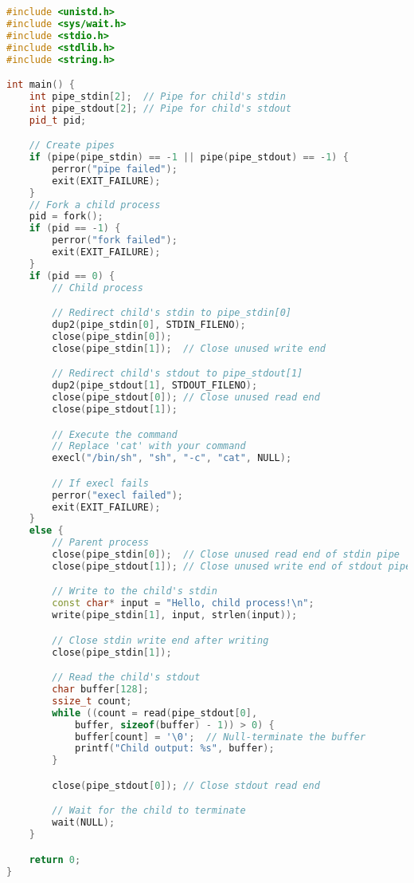 \begin{lstlisting}[language=cpp]
#include <unistd.h>
#include <sys/wait.h>
#include <stdio.h>
#include <stdlib.h>
#include <string.h>

int main() {
    int pipe_stdin[2];  // Pipe for child's stdin
    int pipe_stdout[2]; // Pipe for child's stdout
    pid_t pid;

    // Create pipes
    if (pipe(pipe_stdin) == -1 || pipe(pipe_stdout) == -1) {
        perror("pipe failed");
        exit(EXIT_FAILURE);
    }
    // Fork a child process
    pid = fork();
    if (pid == -1) {
        perror("fork failed");
        exit(EXIT_FAILURE);
    }
    if (pid == 0) {
        // Child process

        // Redirect child's stdin to pipe_stdin[0]
        dup2(pipe_stdin[0], STDIN_FILENO);
        close(pipe_stdin[0]);
        close(pipe_stdin[1]);  // Close unused write end

        // Redirect child's stdout to pipe_stdout[1]
        dup2(pipe_stdout[1], STDOUT_FILENO);
        close(pipe_stdout[0]); // Close unused read end
        close(pipe_stdout[1]);

        // Execute the command
        // Replace 'cat' with your command
        execl("/bin/sh", "sh", "-c", "cat", NULL);

        // If execl fails
        perror("execl failed");
        exit(EXIT_FAILURE);
    }
    else {
        // Parent process
        close(pipe_stdin[0]);  // Close unused read end of stdin pipe
        close(pipe_stdout[1]); // Close unused write end of stdout pipe

        // Write to the child's stdin
        const char* input = "Hello, child process!\n";
        write(pipe_stdin[1], input, strlen(input));

        // Close stdin write end after writing
        close(pipe_stdin[1]);

        // Read the child's stdout
        char buffer[128];
        ssize_t count;
        while ((count = read(pipe_stdout[0],
            buffer, sizeof(buffer) - 1)) > 0) {
            buffer[count] = '\0';  // Null-terminate the buffer
            printf("Child output: %s", buffer);
        }

        close(pipe_stdout[0]); // Close stdout read end

        // Wait for the child to terminate
        wait(NULL);
    }

    return 0;
}
\end{lstlisting}
